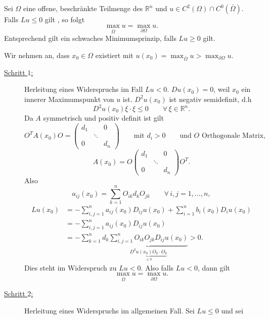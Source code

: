 \begin{satz}
	Sei $\Omega$ eine offene, beschränkte Teilmenge des $\mathbb{R}^n$ und $u \in C^2(\Omega) \cap C^0(\bar{\Omega})$. Falls $Lu \leq 0$ gilt , so folgt
	\begin{equation}
		\max_{\bar \Omega}u = \max_{ \partial \Omega}u.
	\end{equation}
	Entsprechend gilt ein schwaches Minimumsprinzip, falls $Lu \geq 0$ gilt.
\end{satz}
\begin{beweis}
	Wir nehmen an, dass $x_0 \in \Omega$ existiert mit $u(x_0)= \max_{\bar{\Omega}}u > \max_{ \partial \Omega}u$.
	\begin{description}
		\item[\underline{Schritt $1$:}]Herleitung eines Widerspruchs im Fall $Lu < 0$. $Du(x_0)=0$, weil $x_0$ ein innerer Maximumspunkt von $u$ ist. $D^2u(x_0)$ ist negativ semidefinit, d.h 
		\begin{equation}
			D^2u(x_0) \xi \cdot \xi \leq 0 \qquad \forall\, \xi \in \mathbb{R}^n.
		\end{equation}  
		Da $A$ symmetrisch und positiv definit ist gilt 
		\[
			O^T A(x_0) O = \begin{pmatrix}
				d_1 & & 0 \\ & \ddots & \\ 0 & & d_n
			\end{pmatrix} \qquad \text{mit } d_i > 0 \qquad \text{und } O \text{ Orthogonale Matrix,}
		\]
		\[
			A(x_0)= O \begin{pmatrix}
				d_1 & & 0 \\ & \ddots & \\ 0 & & d_n
			\end{pmatrix} O^T.
		\]
		Also
		\[
			a_{ij}(x_0) = \sum^{n}_{k=1}O_{ik}d_kO_{jk} \qquad \forall\, i,j=1,\dots,n,
		\]
		\begin{align*}
			Lu(x_0) &= - \sum^{n}_{i,j=1} a_{ij}(x_0) D_{ij}u(x_0) + \sum^{n}_{i=1}b_i(x_0)D_iu(x_0)  \\
			&= - \sum^{n}_{i,j=1} a_{ij}(x_0)D_{ij}u(x_0) \\
			&= - \sum_{k=1}^{n} d_k \underset{\underset{\leq 0}{\underbrace{D^2u(x_0)O_k \cdot O_k}}}{\underbrace{\sum^{n}_{i,j=1} O_{ik}O_{jk} D_{ij}u(x_0)}} > 0.
		\end{align*}
		Dies steht im Widerspruch zu $Lu < 0$. Also falls $Lu < 0$, dann gilt
		\[
			\max_{\bar{\Omega}}u = \max_{ \partial \Omega}u.
		\]
		\item[\underline{Schritt $2$:}] Herleitung eines Widerspruchs im allgemeinen Fall. Sei $Lu \leq 0$ und sei 

\end{description}
\end{beweis}
